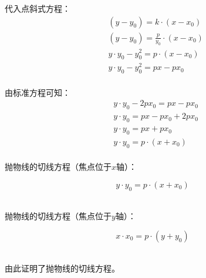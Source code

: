 \documentclass[UTF8]{ctexart}
\begin{document}
    代入点斜式方程：
    \begin{align}
        &(y-y_0)=k\cdot(x-x_0)\\[3mm]
        &(y-y_0)=\frac{p}{y_0}\cdot(x-x_0)\\[3mm]
        &y\cdot y_0-y_0^2=p\cdot(x-x_0)\\[3mm]
        &y\cdot y_0-y_0^2=px-px_0
    \end{align}\\
    由标准方程可知：
    \begin{align}
        &y\cdot y_0-2px_0=px-px_0\\[3mm]
        &y\cdot y_0=px-px_0+2px_0\\[3mm]
        &y\cdot y_0=px+px_0\\[3mm]
        &y\cdot y_0=p\cdot(x+x_0)
    \end{align}\\
    抛物线的切线方程（焦点位于$x$轴）：
    \begin{large}
        \begin{equation*}
            y\cdot y_0=p\cdot(x+x_0)
        \end{equation*}
    \end{large}\\
    抛物线的切线方程（焦点位于$y$轴）：
    \begin{large}
        \begin{equation*}
            x\cdot x_0=p\cdot(y+y_0)
        \end{equation*}
    \end{large}\\
    由此证明了抛物线的切线方程。

\newpage
\end{document}
